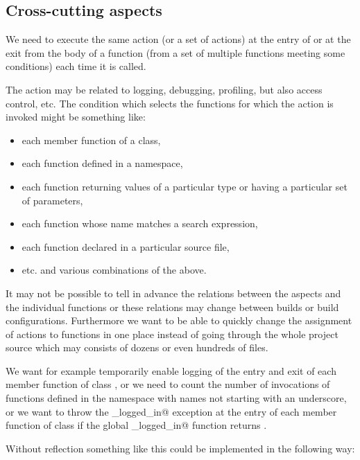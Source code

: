 \subsection{Cross-cutting aspects}

We need to execute the same action (or a set of actions) at the entry of or at the exit from the body of
a function (from a set of multiple functions meeting some conditions) each time it is called.

The action may be related to logging, debugging, profiling, but also access control, etc.
The condition which selects the functions for which the action is invoked might be something like:
\begin{itemize}
\item each member function of a class,
\item each function defined in a namespace,
\item each function returning values of a particular type or having a particular set of parameters,
\item each function whose name matches a search expression,
\item each function declared in a particular source file,
\item etc. and various combinations of the above.
\end{itemize}

It may not be possible to tell in advance the relations between the aspects and the individual functions
or these relations may change between builds or build configurations.
Furthermore we want to be able to quickly change the assignment of actions to functions in one
place instead of going through the whole project source which may consists of dozens or even hundreds of files.

We want for example temporarily enable logging of the entry and exit of each member function of class \verb@foo@,
or we need to count the number of invocations of functions defined in the \verb@bar@ namespace with
names not starting with an underscore, or we want to throw the \verb@not_logged_in@ exception at the entry
of each member function of class \verb@secure@ if the global \verb@user_logged_in@ function returns \verb@false@.

Without reflection something like this could be implemented in the following way:

